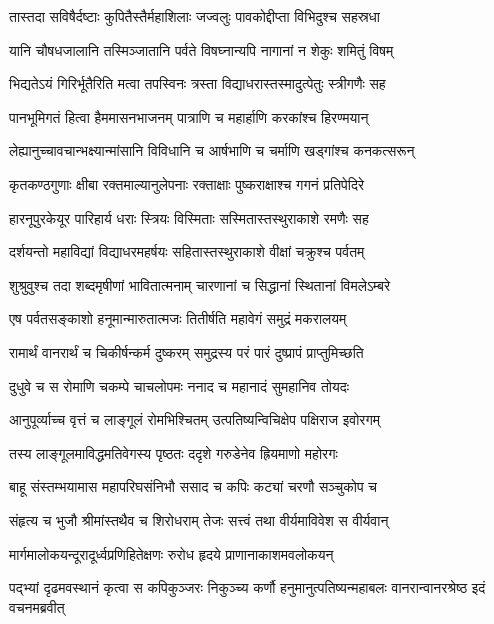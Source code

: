 \twolineshloka
{तास्तदा सविषैर्दष्टाः कुपितैस्तैर्महाशिलाः}
{जज्वलुः पावकोद्दीप्ता विभिदुश्च सहस्रधा} %

\twolineshloka
{यानि चौषधजालानि तस्मिञ्जातानि पर्वते}
{विषघ्नान्यपि नागानां न शेकुः शमितुं विषम्} %

\twolineshloka
{भिद्यतेऽयं गिरिर्भूतैरिति मत्वा तपस्विनः}
{त्रस्ता विद्याधरास्तस्मादुत्पेतुः स्त्रीगणैः सह} %

\twolineshloka
{पानभूमिगतं हित्वा हैममासनभाजनम्}
{पात्राणि च महार्हाणि करकांश्च हिरण्मयान्} %

\twolineshloka
{लेह्यानुच्चावचान्भक्ष्यान्मांसानि विविधानि च}
{आर्षभाणि च चर्माणि खड्गांश्च कनकत्सरून्} %

\twolineshloka
{कृतकण्ठगुणाः क्षीबा रक्तमाल्यानुलेपनाः}
{रक्ताक्षाः पुष्कराक्षाश्च गगनं प्रतिपेदिरे} %

\twolineshloka
{हारनूपुरकेयूर पारिहार्य धराः स्त्रियः}
{विस्मिताः सस्मितास्तस्थुराकाशे रमणैः सह} %

\twolineshloka
{दर्शयन्तो महाविद्यां विद्याधरमहर्षयः}
{सहितास्तस्थुराकाशे वीक्षां चक्रुश्च पर्वतम्} %

\twolineshloka
{शुश्रुवुश्च तदा शब्दमृषीणां भावितात्मनाम्}
{चारणानां च सिद्धानां स्थितानां विमलेऽम्बरे} %

\twolineshloka
{एष पर्वतसङ्काशो हनूमान्मारुतात्मजः}
{तितीर्षति महावेगं समुद्रं मकरालयम्} %

\twolineshloka
{रामार्थं वानरार्थं च चिकीर्षन्कर्म दुष्करम्}
{समुद्रस्य परं पारं दुष्प्रापं प्राप्तुमिच्छति} %

\twolineshloka
{दुधुवे च स रोमाणि चकम्पे चाचलोपमः}
{ननाद च महानादं सुमहानिव तोयदः} %

\twolineshloka
{आनुपूर्व्याच्च वृत्तं च लाङ्गूलं रोमभिश्चितम्}
{उत्पतिष्यन्विचिक्षेप पक्षिराज इवोरगम्} %

\twolineshloka
{तस्य लाङ्गूलमाविद्धमतिवेगस्य पृष्ठतः}
{ददृशे गरुडेनेव ह्रियमाणो महोरगः} %

\twolineshloka
{बाहू संस्तम्भयामास महापरिघसंनिभौ}
{ससाद च कपिः कट्यां चरणौ सञ्चुकोप च} %

\twolineshloka
{संहृत्य च भुजौ श्रीमांस्तथैव च शिरोधराम्}
{तेजः सत्त्वं तथा वीर्यमाविवेश स वीर्यवान्} %

\twolineshloka
{मार्गमालोकयन्दूरादूर्ध्वप्रणिहितेक्षणः}
{रुरोध हृदये प्राणानाकाशमवलोकयन्} %

\threelineshloka
{पद्भ्यां दृढमवस्थानं कृत्वा स कपिकुञ्जरः}
{निकुञ्च्य कर्णौ हनुमानुत्पतिष्यन्महाबलः}
{वानरान्वानरश्रेष्ठ इदं वचनमब्रवीत्} %

